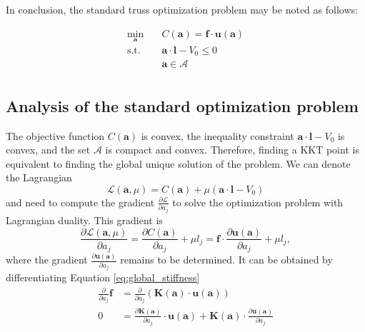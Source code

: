 In conclusion, the standard truss optimization problem may be noted as follows:

\begin{equation}
    \begin{aligned}
        \min_{\mathbf{a}} \quad & C(\mathbf{a}) = \mathbf{f} \cdot \mathbf{u}(\mathbf{a})\\
        \textrm{s.t.} \quad & \mathbf{a} \cdot \mathbf{l} - V_0 \le 0  \\
                            & \mathbf{a} \in \mathcal{A}\\
    \end{aligned}
    \label{eq:size_optimization}
\end{equation}

\subsection{Analysis of the standard optimization problem}
The objective function $C(\mathbf{a})$ is convex, the inequality constraint $\mathbf{a} \cdot \mathbf{l} - V_0$ is convex, and the set $\mathcal{A}$ is compact and convex. Therefore, finding a KKT point is equivalent to finding the global unique solution of the problem. We can denote the Lagrangian 
\begin{equation}
    \mathcal{L}(\mathbf{a}, \mu) = C(\mathbf{a}) + \mu \left( \mathbf{a} \cdot \mathbf{l} - V_0 \right) 
\end{equation}
and need to compute the gradient $\frac{\partial \mathcal{L}}{\partial a_j}$ to solve the optimization problem with Lagrangian duality. This gradient is 
\begin{equation}
    \frac{\partial \mathcal{L} (\mathbf{a}, \mu)}{\partial a_j} 
    = \frac{\partial C (\mathbf{a})}{\partial a_j} + \mu l_j
    = \mathbf{f} \cdot \frac{\partial \mathbf{u} (\mathbf{a})}{\partial a_j} + \mu l_j,
    \label{eq:lagrange_truss_problem}
\end{equation}
where the gradient $\frac{\partial \mathbf{u} (\mathbf{a})}{\partial a_j}$ remains to be determined. It can be obtained by differentiating Equation \eqref{eq:global_stiffness}
\begin{align}
        \frac{\partial}{\partial a_j} \mathbf{f} &= \frac{\partial}{\partial a_j} \left( \mathbf{K} (\mathbf{a}) \cdot \mathbf{u} (\mathbf{a}) \right) \\
        0 &= \frac{\partial \mathbf{K} (\mathbf{a})}{\partial a_j} \cdot \mathbf{u} (\mathbf{a}) + \mathbf{K} (\mathbf{a}) \cdot \frac{\partial \mathbf{u} (\mathbf{a})}{\partial a_j}
\end{align}
